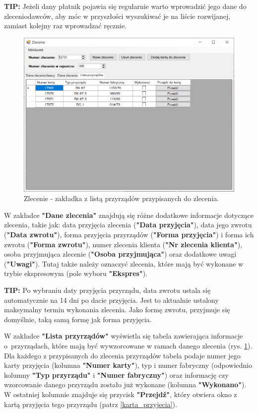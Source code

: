 \textbf{TIP:} Jeżeli dany płatnik pojawia się regularnie warto wprowadzić jego dane do zleceniodawców, aby móc w przyszłości wyszukiwać je na liście rozwijanej, zamiast kolejny raz wprowadzać ręcznie.

\begin{figure}[htb]
	\centering
	\includegraphics[width=\columnwidth]{obrazki/Biuro/zlecenie/zlecenie_lista.png}
	\caption{Zlecenie - zakładka z listą przyrządów przypisanych do zlecenia.}
	\label{zlecenieLista}
\end{figure}

W zakładce \textbf{"Dane zlecenia"} znajdują się różne dodatkowe informacje dotyczące zlecenia, takie jak: data przyjęcia zlecenia (\textbf{"Data przyjęcia"}), data jego zwrotu (\textbf{"Data zwrotu"}), forma przyjęcia przyrządów (\textbf{"Forma przyjęcia"}) i forma ich zwrotu (\textbf{"Forma zwrotu"}), numer zlecenia klienta (\textbf{"Nr zlecenia klienta"}), osoba przyjmująca zlecenie (\textbf{"Osoba przyjmująca"}) oraz dodatkowe uwagi (\textbf{"Uwagi"}). Tutaj także należy oznaczyć zlecenia, które mają być wykonane w trybie ekspresowym (pole wyboru \textbf{"Ekspres"}). 

\textbf{TIP:} Po wybraniu daty przyjęcia przyrządu, data zwrotu ustala się automatycznie na 14 dni po dacie przyjęcia. Jest to aktualnie ustalony maksymalny termin wykonania zlecenia. Jako formę zwrotu, przyjmuje się domyślnie, taką samą formę jak forma przyjęcia.

W zakładce \textbf{"Lista przyrządów"} wyświetla się tabela zawierająca informacje o~przyrządach, które mają być wywzorcowane w ramach danego zlecenia (rys. \ref{zlecenieLista}). Dla każdego z przypisanych do zlecenia przyrządów tabela podaje numer jego karty przyjęcia (kolumna \textbf{"Numer karty"}), typ i numer fabryczny (odpowiednio kolumny \textbf{"Typ przyrządu"} i \textbf{"Numer fabryczny"}) oraz informację czy wzorcowanie danego przyrządu zostało już wykonane (kolumna \textbf{"Wykonano"}). W ostatniej kolumnie znajduje się przycisk \textbf{"Przejdź"}, który otwiera okno z kartą przyjęcia tego przyrządu (patrz \ref{karta_przyjecia}).

